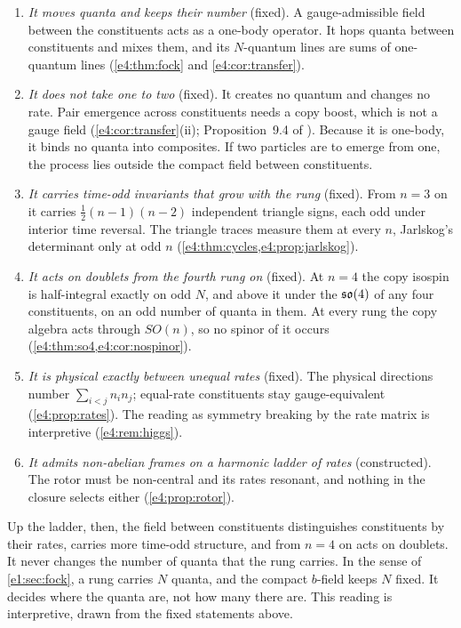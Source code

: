 \begin{remark}
\label{e4:rem:answer}
\begin{enumerate}[label=(\alph*),leftmargin=2.2em]
\item \emph{It moves quanta and keeps their number} (fixed). A gauge-admissible field between the constituents acts as a one-body operator.
It hops quanta between constituents and mixes them, and its $N$-quantum lines are sums of one-quantum lines (\cref{e4:thm:fock} and
\cref{e4:cor:transfer}).
\item \emph{It does not take one to two} (fixed). It creates no quantum and changes no rate. Pair emergence across constituents needs a copy boost,
which is not a gauge field (\cref{e4:cor:transfer}(ii); Proposition~9.4 of \cite{RE}). Because it is one-body, it binds no quanta into composites.
If two particles are to emerge from one, the process lies outside the compact field between constituents.
\item \emph{It carries time-odd invariants that grow with the rung} (fixed). From $n=3$ on it carries $\tfrac12(n-1)(n-2)$ independent triangle signs, each odd
under interior time reversal. The triangle traces measure them at every $n$, Jarlskog's determinant only at odd $n$
(\cref{e4:thm:cycles,e4:prop:jarlskog}).
\item \emph{It acts on doublets from the fourth rung on} (fixed). At $n=4$ the copy isospin is half-integral exactly on odd $N$, and above it under the
$\mathfrak{so}(4)$ of any four constituents, on an odd number of quanta in them. At every rung the copy algebra acts through $SO(n)$, so no spinor of it
occurs (\cref{e4:thm:so4,e4:cor:nospinor}).
\item \emph{It is physical exactly between unequal rates} (fixed). The physical directions number $\sum_{i<j}n_in_j$; equal-rate constituents stay
gauge-equivalent (\cref{e4:prop:rates}). The reading as symmetry breaking by the rate matrix is interpretive (\cref{e4:rem:higgs}).
\item \emph{It admits non-abelian frames on a harmonic ladder of rates} (constructed). The rotor must be non-central and its rates resonant, and
nothing in the closure selects either (\cref{e4:prop:rotor}).
\end{enumerate}
Up the ladder, then, the field between constituents distinguishes constituents by their rates, carries more time-odd structure, and from
$n=4$ on acts on doublets. It never changes the number of quanta that the rung carries. In the sense of \cref{e1:sec:fock}, a rung carries $N$
quanta, and the compact $b$-field keeps $N$ fixed. It decides where the quanta are, not how many there are. This reading is interpretive, drawn
from the fixed statements above.
\end{remark}

